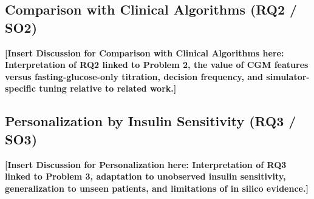 \documentclass[conference]{IEEEtran}
\begin{document}
\subsection{Comparison with Clinical Algorithms (RQ2 / SO2)}
\textbf{[Insert Discussion for Comparison with Clinical Algorithms here: Interpretation of RQ2 linked to Problem 2, the value of CGM features versus
fasting-glucose-only titration, decision frequency, and simulator-specific tuning relative to
related work.]}

\subsection{Personalization by Insulin Sensitivity (RQ3 / SO3)}
\textbf{[Insert Discussion for Personalization here: Interpretation of RQ3 linked to Problem 3, adaptation to unobserved insulin
sensitivity, generalization to unseen patients, and limitations of in silico evidence.]}
\end{document}
